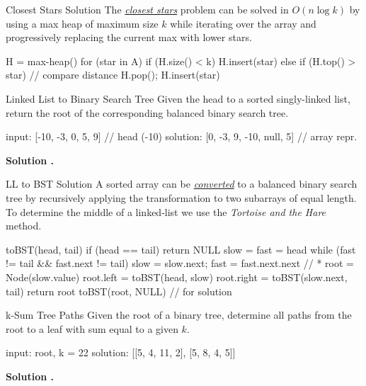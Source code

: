 \documentclass{cognito}
\begin{document}
\begin{note}{Closest Stars Solution}
	The \hyperref[note:Closest Stars Problem]{\it closest stars} problem can be solved
	in $O(n \log k)$ by using a max heap of maximum size $k$ while iterating over the
	array  and progressively replacing the current max with lower stars.
	
	\begin{largecode}
 H = max-heap()
 for (star in A)
 	if (H.size() < k) H.insert(star)
	else if (H.top() > star)  // compare distance
		H.pop(); H.insert(star)
	\end{largecode}
	\vspace{-5pt}
\end{note}

\begin{note}{Linked List to Binary Search Tree}
	Given the head to a sorted singly-linked list, return the root of
	the corresponding balanced binary search tree.
	
	\begin{largecode}
 input: [-10, -3, 0, 5, 9]           // head (-10)
 solution: [0, -3, 9, -10, null, 5]  // array repr.
	\end{largecode}
	\bf Solution \hyperref[note:LL to BST Solution]{\solutionref}.
\end{note}

\begin{note}{LL to BST Solution}
	A sorted array can be \hyperref[note:Linked List to Binary Search Tree]{\it converted} to a balanced
	binary search tree by recursively applying the transformation to two subarrays of equal length.
	To determine the middle of a linked-list we use the {\it Tortoise and the Hare} method.
	
	\begin{largecode}
 toBST(head, tail)
 	if (head == tail) return NULL
	slow = fast = head
	while (fast != tail && fast.next != tail)
		slow = slow.next; fast = fast.next.next  // *
	root = Node(slow.value)
	root.left = toBST(head, slow)
	root.right = toBST(slow.next, tail)
	return root
 toBST(root, NULL)  // for solution
	\end{largecode}
	\vspace{-5pt}
\end{note}

\begin{note}{k-Sum Tree Paths}
	Given the root of a binary tree, determine all paths from the root to a leaf with
	sum equal to a given $k$.
	
	\begin{largecode}
 input: root, k = 22
 solution: [[5, 4, 11, 2], [5, 8, 4, 5]]
	\end{largecode}
	\bf Solution \hyperref[note:k-Sum Tree Paths Solution]{\solutionref}.
\end{note}
\end{document}
